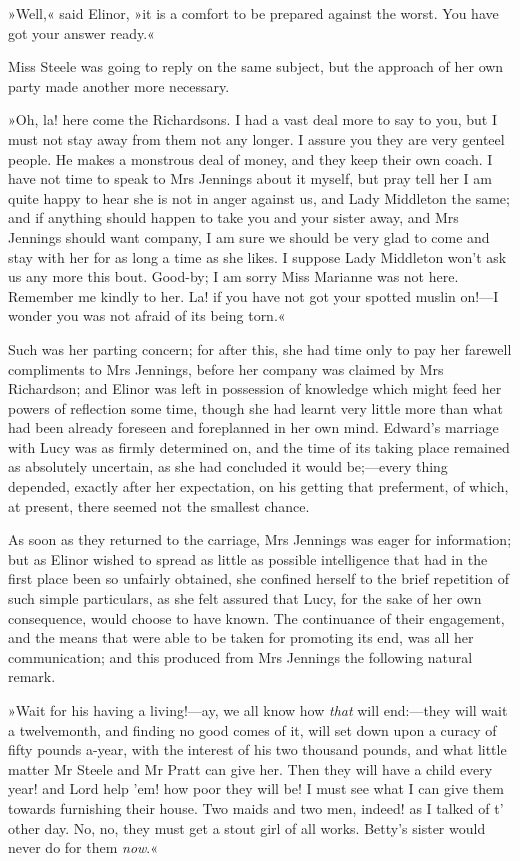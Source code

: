 »Well,« said Elinor, »it is a comfort to be prepared against the worst. You have got your answer ready.«

Miss Steele was going to reply on the same subject, but the approach of her own party made another more necessary.

»Oh, la! here come the Richardsons. I had a vast deal more to say to you, but I must not stay away from them not any longer. I assure you they are very genteel people. He makes a monstrous deal of money, and they keep their own coach. I have not time to speak to Mrs Jennings about it myself, but pray tell her I am quite happy to hear she is not in anger against us, and Lady Middleton the same; and if anything should happen to take you and your sister away, and Mrs Jennings should want company, I am sure we should be very glad to come and stay with her for as long a time as she likes. I suppose Lady Middleton won’t ask us any more this bout. Good-by; I am sorry Miss Marianne was not here. Remember me kindly to her. La! if you have not got your spotted muslin on!—I wonder you was not afraid of its being torn.«

Such was her parting concern; for after this, she had time only to pay her farewell compliments to Mrs Jennings, before her company was claimed by Mrs Richardson; and Elinor was left in possession of knowledge which might feed her powers of reflection some time, though she had learnt very little more than what had been already foreseen and foreplanned in her own mind. Edward’s marriage with Lucy was as firmly determined on, and the time of its taking place remained as absolutely uncertain, as she had concluded it would be;—every thing depended, exactly after her expectation, on his getting that preferment, of which, at present, there seemed not the smallest chance.

As soon as they returned to the carriage, Mrs Jennings was eager for information; but as Elinor wished to spread as little as possible intelligence that had in the first place been so unfairly obtained, she confined herself to the brief repetition of such simple particulars, as she felt assured that Lucy, for the sake of her own consequence, would choose to have known. The continuance of their engagement, and the means that were able to be taken for promoting its end, was all her communication; and this produced from Mrs Jennings the following natural remark.

»Wait for his having a living!—ay, we all know how \textit{that} will end:—they will wait a twelvemonth, and finding no good comes of it, will set down upon a curacy of fifty pounds a-year, with the interest of his two thousand pounds, and what little matter Mr Steele and Mr Pratt can give her. Then they will have a child every year! and Lord help ’em! how poor they will be! I must see what I can give them towards furnishing their house. Two maids and two men, indeed! as I talked of t’ other day. No, no, they must get a stout girl of all works. Betty’s sister would never do for them \textit{now}.«

